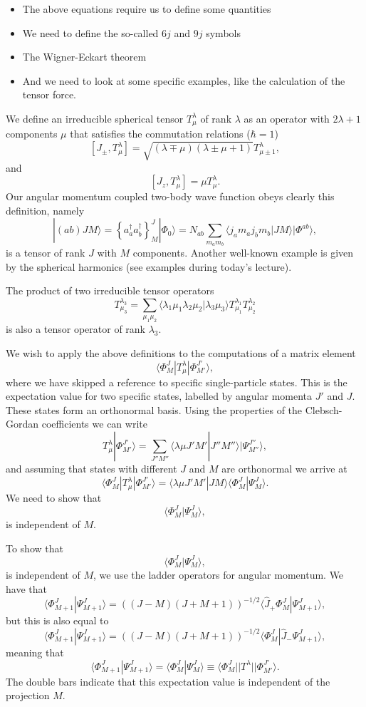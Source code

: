 {\begin{itemize}
\item The above equations require us to define some quantities
\item We need to define the so-called $6j$ and $9j$ symbols
\item The Wigner-Eckart theorem
\item And we need to look at some specific examples, like the calculation of the tensor force.
\end{itemize}

We define an irreducible  spherical tensor $T^{\lambda}_{\mu}$ of rank $\lambda$ as an operator with $2\lambda+1$ components $\mu$ 
that satisfies the commutation relations ($\hbar=1$)
\[
[J_{\pm}, T^{\lambda}_{\mu}]= \sqrt{(\lambda\mp \mu)(\lambda\pm \mu+1)}T^{\lambda}_{\mu\pm 1},
\]
and 
\[
[J_{z}, T^{\lambda}_{\mu}]=\mu T^{\lambda}_{\mu}.
\]
Our angular momentum coupled two-body wave function obeys clearly this definition, namely
\[
|(ab)JM\rangle  = \left\{a^{\dagger}_aa^{\dagger}_b\right\}^J_M|\Phi_0\rangle=N_{ab}\sum_{m_am_b}\langle j_am_aj_bm_b|JM\rangle|\Phi^{ab}\rangle, 
\]
is a tensor of rank $J$ with $M$ components. Another well-known example is given by the spherical harmonics (see examples during today's lecture). 

The product of two irreducible tensor operators
\[
T^{\lambda_3}_{\mu_3}=\sum_{\mu_1\mu_2}\langle \lambda_1\mu_1\lambda_2\mu_2|\lambda_3\mu_3\rangle T^{\lambda_1}_{\mu_1}T^{\lambda_2}_{\mu_2}
\] 
is also a tensor operator of rank $\lambda_3$. 

We wish to apply the above definitions to the computations of a matrix element
\[
\langle \Phi^J_M|T^{\lambda}_{\mu}|\Phi^{J'}_{M'}\rangle,
\]
where we have skipped a reference to specific single-particle states. This is the expectation value for two specific states, labelled by angular momenta $J'$ and $J$. These states form an orthonormal basis.
Using the properties of the Clebsch-Gordan coefficients we can write 
\[
T^{\lambda}_{\mu}|\Phi^{J'}_{M'}\rangle=\sum_{J''M''}\langle \lambda \mu J'M'|J''M''\rangle|\Psi^{J''}_{M''}\rangle,
\]
and assuming that states with different $J$ and $M$ are orthonormal we arrive at
\[
\langle \Phi^J_M|T^{\lambda}_{\mu}|\Phi^{J'}_{M'}\rangle= \langle \lambda \mu J'M'|JM\rangle \langle \Phi^J_M|\Psi^{J}_{M}\rangle.
\]
We need to show that 
\[
\langle \Phi^J_M|\Psi^{J}_{M}\rangle,
\]
is independent of $M$.

To show that 
\[
\langle \Phi^J_M|\Psi^{J}_{M}\rangle,
\]
is independent of $M$, we use the ladder operators for angular momentum. We have that
\[
\langle \Phi^J_{M+1}|\Psi^{J}_{M+1}\rangle=\left((J-M)(J+M+1)\right)^{-1/2}\langle \hat{J}_{+}\Phi^J_{M}|\Psi^{J}_{M+1}\rangle,
\]
but this is also equal to 
\[
\langle \Phi^J_{M+1}|\Psi^{J}_{M+1}\rangle=\left((J-M)(J+M+1)\right)^{-1/2}\langle \Phi^J_{M}|\hat{J}_{-}\Psi^{J}_{M+1}\rangle,
\]
meaning that
\[
\langle \Phi^J_{M+1}|\Psi^{J}_{M+1}\rangle=\langle \Phi^J_M|\Psi^{J}_{M}\rangle\equiv\langle \Phi^J_{M}||T^{\lambda}||\Phi^{J'}_{M'}\rangle.
\]
The double bars indicate that this expectation value is independent of the projection $M$.

}
